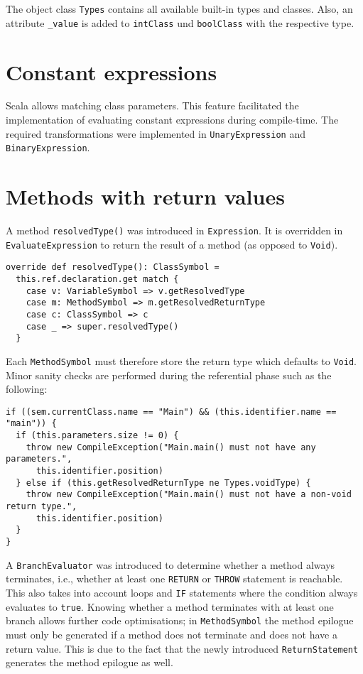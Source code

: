 \documentclass{guide}
\begin{document}
	The object class \texttt{Types} contains all available built-in types and classes.
	Also, an attribute \texttt{\_value} is added to \texttt{intClass} und \texttt{boolClass}
	with the respective type.

	\section{Constant expressions}
	Scala allows matching class parameters. This feature facilitated the
	implementation of evaluating constant expressions during compile-time. The
	required transformations were implemented in \texttt{UnaryExpression} and
	\texttt{BinaryExpression}.

	\section{Methods with return values}
	A method \texttt{resolvedType()} was introduced in \texttt{Expression}. It
	is overridden in \texttt{EvaluateExpression} to return the result of a
	method (as opposed to \texttt{Void}).

\begin{verbatim}
override def resolvedType(): ClassSymbol =
  this.ref.declaration.get match {
    case v: VariableSymbol => v.getResolvedType
    case m: MethodSymbol => m.getResolvedReturnType
    case c: ClassSymbol => c
    case _ => super.resolvedType()
  }
\end{verbatim}

	Each \texttt{MethodSymbol} must therefore store the return type which defaults
	to \texttt{Void}. Minor sanity checks are performed during the referential
	phase such as the following:

\begin{verbatim}
if ((sem.currentClass.name == "Main") && (this.identifier.name == "main")) {
  if (this.parameters.size != 0) {
    throw new CompileException("Main.main() must not have any parameters.",
      this.identifier.position)
  } else if (this.getResolvedReturnType ne Types.voidType) {
    throw new CompileException("Main.main() must not have a non-void return type.",
      this.identifier.position)
  }
}
\end{verbatim}

	A \texttt{BranchEvaluator} was introduced to determine whether a method always
	terminates, i.e., whether at least one \texttt{RETURN} or \texttt{THROW} statement is reachable.
	This also takes into account loops and \texttt{IF} statements where the condition always
	evaluates to \texttt{true}. Knowing whether a method terminates with at least one branch
	allows further code optimisations; in \texttt{MethodSymbol} the method epilogue
	must only be generated if a method does not terminate and does not have a
	return value. This is due to the fact that the newly introduced
	\texttt{ReturnStatement} generates the method epilogue as well.
\end{document}
